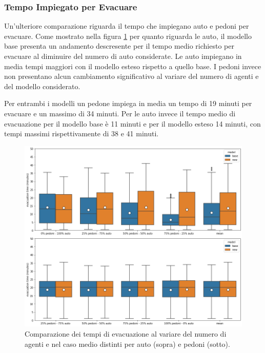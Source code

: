 \pagebreak

\subsubsection*{Tempo Impiegato per Evacuare}
Un'ulteriore comparazione riguarda il tempo che impiegano auto e pedoni per evacuare.
Come mostrato nella figura \ref{fig:analisi-comparison-evtimes2} per quanto riguarda le auto, il modello base presenta un andamento descresente per il tempo medio richiesto per evacuare al diminuire del numero di auto considerate.
Le auto impiegano in media tempi maggiori con il modello esteso rispetto a quello base.
%
I pedoni invece non presentano alcun cambiamento significativo al variare del numero di agenti e del modello considerato.

Per entrambi i modelli un pedone impiega in media un tempo di 19 minuti per evacuare e un massimo di 34 minuti.
Per le auto invece il tempo medio di evacuazione per il modello base è 11 minuti e per il modello esteso 14 minuti,
con tempi massimi rispettivamente di 38 e 41 minuti.

\begin{figure}[ht]
    \centering
    \includegraphics[width=\textwidth]{images/analisi/comparison-evtimes2.png}
    \caption{
        Comparazione dei tempi di evacuazione al variare del numero di agenti e nel caso medio distinti per auto (sopra) e pedoni (sotto).
    }
    \label{fig:analisi-comparison-evtimes2}
\end{figure}


